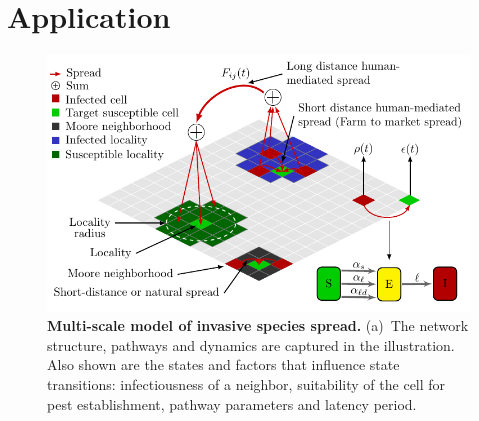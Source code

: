 \documentclass{article}
\begin{document}
\section{Application}
\begin{figure}[t]
\centering
\includegraphics[width=1.1\textwidth]{figs/model_schematic.pdf}
\caption{\textbf{Multi-scale model of invasive species spread.} (a)~The
network structure, pathways and dynamics are captured in the illustration.
Also shown are the states and factors that influence state transitions:
infectiousness of a neighbor, suitability of the cell for pest
establishment, pathway parameters and latency period.
\label{fig:modelConcept}}
\end{figure}
\end{document}
